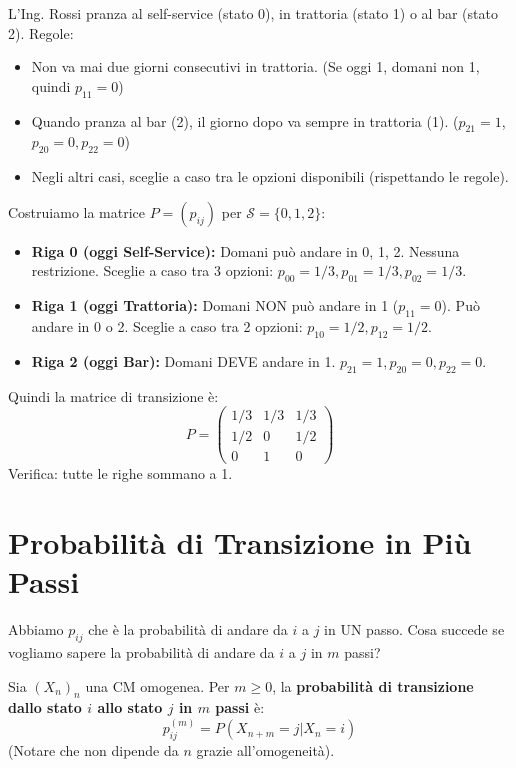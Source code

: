 \begin{example}
L'Ing. Rossi pranza al self-service (stato 0), in trattoria (stato 1) o al bar (stato 2).
Regole:
\begin{itemize}
    \item Non va mai due giorni consecutivi in trattoria. (Se oggi 1, domani non 1, quindi $p_{11}=0$)
    \item Quando pranza al bar (2), il giorno dopo va sempre in trattoria (1). ($p_{21}=1$, $p_{20}=0, p_{22}=0$)
    \item Negli altri casi, sceglie a caso tra le opzioni disponibili (rispettando le regole).
\end{itemize}
Costruiamo la matrice $P = (p_{ij})$ per $\mathcal{S}=\{0,1,2\}$:
\begin{itemize}
    \item \textbf{Riga 0 (oggi Self-Service):} Domani può andare in 0, 1, 2. Nessuna restrizione. Sceglie a caso tra 3 opzioni: $p_{00}=1/3, p_{01}=1/3, p_{02}=1/3$.
    \item \textbf{Riga 1 (oggi Trattoria):} Domani NON può andare in 1 ($p_{11}=0$). Può andare in 0 o 2. Sceglie a caso tra 2 opzioni: $p_{10}=1/2, p_{12}=1/2$.
    \item \textbf{Riga 2 (oggi Bar):} Domani DEVE andare in 1. $p_{21}=1, p_{20}=0, p_{22}=0$.
\end{itemize}
Quindi la matrice di transizione è:
\begin{equation*}
P = \begin{pmatrix}
1/3 & 1/3 & 1/3 \\
1/2 & 0 & 1/2 \\
0 & 1 & 0
\end{pmatrix}
\end{equation*}
Verifica: tutte le righe sommano a 1.
\end{example}

\section{Probabilità di Transizione in Più Passi}
Abbiamo $p_{ij}$ che è la probabilità di andare da $i$ a $j$ in UN passo. Cosa succede se vogliamo sapere la probabilità di andare da $i$ a $j$ in $m$ passi?

\begin{definition}
Sia $(X_n)_n$ una CM omogenea. Per $m \ge 0$, la \textbf{probabilità di transizione dallo stato $i$ allo stato $j$ in $m$ passi} è:
\begin{equation}
    p_{ij}^{(m)} = P(X_{n+m}=j | X_n=i)
\end{equation}
(Notare che non dipende da $n$ grazie all'omogeneità).
\end{definition}

